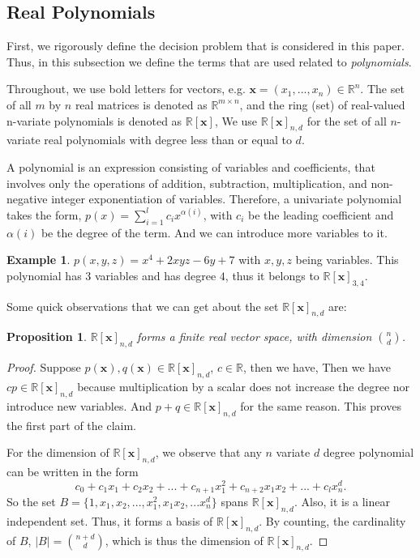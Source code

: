 \documentclass[12pt]{amsart}
\numberwithin{equation}{section}
\newtheorem{prop}[thm]{Proposition}
\theoremstyle{definition}
\newtheorem{example}[thm]{Example}
\numberwithin{thm}{section}
\begin{document}
\subsection{Real Polynomials}
\label{Sec:Real Polynomials}
First, we rigorously define the decision problem that is considered in this paper. 
Thus, in this subsection we define the terms that are used related to \emph{polynomials}.

Throughout, we use bold letters for vectors, e.g. $\mathbf{x} = (x_1, ..., x_n) \in \mathbb{R}^n$.
The set of all $m$ by $n$ real matrices is denoted as $\mathbb{R}^{m \times n}$, and the ring (set) of real-valued n-variate polynomials is denoted as $\mathbb{R}[\mathbf{x}]$, 
We use $\mathbb{R}[\mathbf{x}]_{n, d}$ for the set of all $n$-variate real polynomials with degree less than or equal to $d$.


A polynomial is an expression consisting of variables and coefficients, that involves only the operations of addition, subtraction, multiplication, and non-negative integer exponentiation of variables.
Therefore, a univariate polynomial takes the form, $p(x) = \sum_{i = 1} ^{l} c_i x^{\alpha(i)}$, with $c_i$ be the leading coefficient and $\alpha(i)$ be the degree of the term. 
And we can introduce more variables to it. 

\begin{example}
     $p(x, y, z) = x^4 + 2xyz - 6y + 7$ with $x, y, z$ being variables. 
     This polynomial has $3$ variables and has degree $4$, thus it 
     belongs to $\mathbb{R}[\mathbf{x}]_{3, 4}$.
\end{example}

Some quick observations that we can get about the set $\mathbb{R}[\mathbf{x}]_{n, d}$ are:
\begin{prop}
     \label{prop:vs}
     $\mathbb{R}[\mathbf{x}]_{n, d}$ forms a finite real vector space, with dimension ${n \choose d}$.
\end{prop}
    
\begin{proof}
     Suppose $p(\mathbf{x}), q(\mathbf{x}) \in \mathbb{R}[\mathbf{x}]_{n, d}$, $c \in \mathbb{R}$, then we have,
     Then we have $cp \in \mathbb{R}[\mathbf{x}]_{n, d}$ because multiplication by a scalar does not increase the degree nor introduce new variables.
     And $p + q \in \mathbb{R}[\mathbf{x}]_{n, d}$ for the same reason. This proves the first part of the claim. 

     For the dimension of $\mathbb{R}[\mathbf{x}]_{n, d}$, we observe that
     any $n$ variate $d$ degree polynomial can be written in the form 
     \begin{equation*}c_0 + c_1 x_1 + c_2 x_2 + ... + c_{n+1} x_1^2 + c_{n+2} x_1 x_2 + ... + c_l x_n^d.
     \end{equation*}
     So the set $B = \{1, x_1, x_2, ..., x_1^2, x_1 x_2, ... x_n^d\}$ spans $\mathbb{R}[\mathbf{x}]_{n, d}$.
     Also, it is a linear independent set. Thus, it forms a basis of $\mathbb{R}[\mathbf{x}]_{n, d}$.
     By counting, the cardinality of $B$, $|B| = {n+d \choose d}$, which is thus the dimension of $\mathbb{R}[\mathbf{x}]_{n, d}$.

\end{proof}
\end{document}
